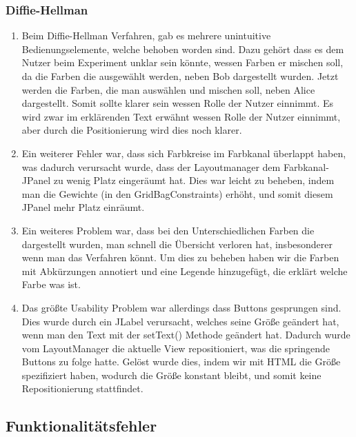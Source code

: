 \documentclass{article}
\begin{document}
     \subsubsection{Diffie-Hellman}
     \begin{enumerate}
         \item Beim Diffie-Hellman Verfahren, gab es mehrere unintuitive Bedienungselemente, welche behoben worden sind.
             Dazu gehört dass es dem Nutzer beim Experiment unklar sein könnte, wessen Farben er mischen soll,
             da die Farben die ausgewählt werden, neben Bob dargestellt wurden. Jetzt werden die Farben,
             die man auswählen und mischen soll, neben Alice dargestellt. Somit sollte klarer sein wessen Rolle
             der Nutzer einnimmt.
             Es wird zwar im erklärenden Text erwähnt wessen Rolle der Nutzer einnimmt, aber durch die Positionierung
             wird dies noch klarer.
         \item Ein weiterer Fehler war, dass sich Farbkreise im Farbkanal überlappt haben,
             was dadurch verursacht wurde, dass der Layoutmanager dem Farbkanal-JPanel zu wenig Platz eingeräumt hat.
             Dies war leicht zu beheben, indem man die Gewichte (in den GridBagConstraints) erhöht,
             und somit diesem JPanel mehr Platz einräumt.
         \item Ein weiteres Problem war, dass bei den Unterschiedlichen Farben die dargestellt wurden,
             man schnell die Übersicht verloren hat, insbesonderer wenn man das Verfahren könnt.
             Um dies zu beheben haben wir die Farben mit Abkürzungen annotiert und eine Legende hinzugefügt,
             die erklärt welche Farbe was ist.
         \item Das größte Usability Problem war allerdings dass Buttons gesprungen sind.
             Dies wurde durch ein JLabel verursacht, welches seine Größe geändert hat,
             wenn man den Text mit der setText() Methode geändert hat.
             Dadurch wurde vom LayoutManager die aktuelle View repositioniert, was die springende Buttons
             zu folge hatte.
             Gelöst wurde dies, indem wir mit HTML die Größe spezifiziert haben, wodurch die Größe konstant bleibt,
             und somit keine Repositionierung stattfindet.
     \end{enumerate}

     \subsection{Funktionalitätsfehler}
\end{document}
